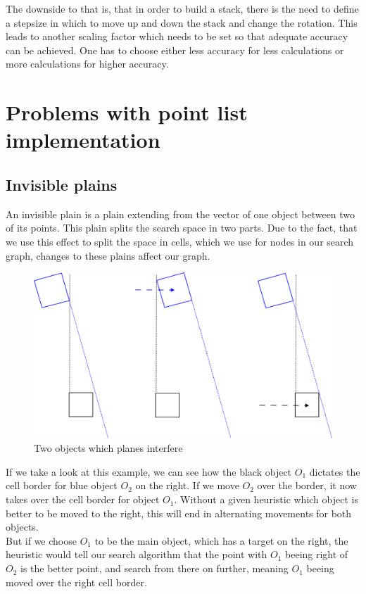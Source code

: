 The downside to that is, that in order to build a stack, there is the need to define a stepsize in which to move up and down the stack and change the rotation. This leads to another scaling factor which needs to be set so that adequate accuracy can be achieved. One has to choose either less accuracy for less calculations or more calculations for higher accuracy.


\section{Problems with point list implementation}
\subsection{Invisible plains}
An invisible plain is a plain extending from the vector of one object between two of its points. This plain splits the search space in two parts. Due to the fact, that we use this effect to split the space in cells, which we use for nodes in our search graph, changes to these plains affect our graph.\\
\begin{figure}[H]
\centering
\includegraphics[scale=0.3]{ghostplanes}
\caption{Two objects which planes interfere}
\end{figure}
If we take a look at this example, we can see how the black object $O_1$ dictates the cell border for blue object $O_2$ on the right. If we move  $O_2$ over the border, it now takes over the cell border for object  $O_1$. Without a given heuristic which object is better to be moved to the right, this will end in alternating movements for both objects.\\
But if we choose  $O_1$ to be the main object, which has a target on the right, the heuristic would tell our search algorithm that the point with $O_1$ beeing right of  $O_2$ is the better point, and search from there on further, meaning $O_1$ beeing moved over the right cell border.

